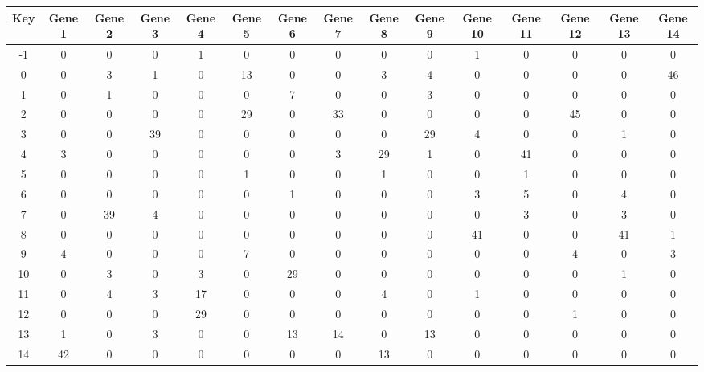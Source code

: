 \begin{tabular}{|c|c|c|c|c|c|c|c|c|c|c|c|c|c|c|}
\hline
Key & Gene 1 & Gene 2 & Gene 3 & Gene 4 & Gene 5 & Gene 6 & Gene 7 & Gene 8 & Gene 9 & Gene 10 & Gene 11 & Gene 12 & Gene 13 & Gene 14 \\
\hline
-1 & 0 & 0 & 0 & 1 & 0 & 0 & 0 & 0 & 0 & 1 & 0 & 0 & 0 & 0 \\
0 & 0 & 3 & 1 & 0 & 13 & 0 & 0 & 3 & 4 & 0 & 0 & 0 & 0 & 46 \\
1 & 0 & 1 & 0 & 0 & 0 & 7 & 0 & 0 & 3 & 0 & 0 & 0 & 0 & 0 \\
2 & 0 & 0 & 0 & 0 & 29 & 0 & 33 & 0 & 0 & 0 & 0 & 45 & 0 & 0 \\
3 & 0 & 0 & 39 & 0 & 0 & 0 & 0 & 0 & 29 & 4 & 0 & 0 & 1 & 0 \\
4 & 3 & 0 & 0 & 0 & 0 & 0 & 3 & 29 & 1 & 0 & 41 & 0 & 0 & 0 \\
5 & 0 & 0 & 0 & 0 & 1 & 0 & 0 & 1 & 0 & 0 & 1 & 0 & 0 & 0 \\
6 & 0 & 0 & 0 & 0 & 0 & 1 & 0 & 0 & 0 & 3 & 5 & 0 & 4 & 0 \\
7 & 0 & 39 & 4 & 0 & 0 & 0 & 0 & 0 & 0 & 0 & 3 & 0 & 3 & 0 \\
8 & 0 & 0 & 0 & 0 & 0 & 0 & 0 & 0 & 0 & 41 & 0 & 0 & 41 & 1 \\
9 & 4 & 0 & 0 & 0 & 7 & 0 & 0 & 0 & 0 & 0 & 0 & 4 & 0 & 3 \\
10 & 0 & 3 & 0 & 3 & 0 & 29 & 0 & 0 & 0 & 0 & 0 & 0 & 1 & 0 \\
11 & 0 & 4 & 3 & 17 & 0 & 0 & 0 & 4 & 0 & 1 & 0 & 0 & 0 & 0 \\
12 & 0 & 0 & 0 & 29 & 0 & 0 & 0 & 0 & 0 & 0 & 0 & 1 & 0 & 0 \\
13 & 1 & 0 & 3 & 0 & 0 & 13 & 14 & 0 & 13 & 0 & 0 & 0 & 0 & 0 \\
14 & 42 & 0 & 0 & 0 & 0 & 0 & 0 & 13 & 0 & 0 & 0 & 0 & 0 & 0 \\
\hline
\end{tabular}